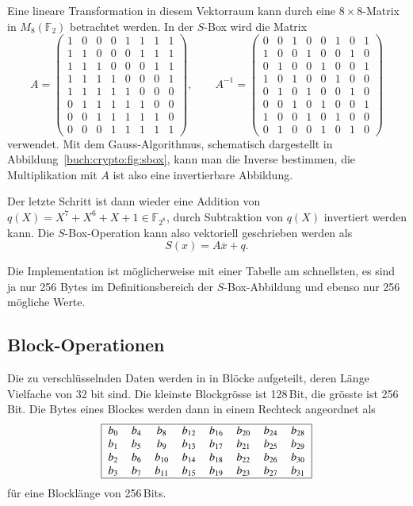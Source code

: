 Eine lineare Transformation in diesem Vektorraum kann durch eine
$8\times 8$-Matrix in $M_8(\mathbb{F}_2)$ betrachtet werden.
In der $S$-Box wird die Matrix
\[
A=
\begin{pmatrix}
1&0&0&0&1&1&1&1\\
1&1&0&0&0&1&1&1\\
1&1&1&0&0&0&1&1\\
1&1&1&1&0&0&0&1\\
1&1&1&1&1&0&0&0\\
0&1&1&1&1&1&0&0\\
0&0&1&1&1&1&1&0\\
0&0&0&1&1&1&1&1
\end{pmatrix},
\qquad
A^{-1}
=
\begin{pmatrix}
0&0&1&0&0&1&0&1\\
1&0&0&1&0&0&1&0\\
0&1&0&0&1&0&0&1\\
1&0&1&0&0&1&0&0\\
0&1&0&1&0&0&1&0\\
0&0&1&0&1&0&0&1\\
1&0&0&1&0&1&0&0\\
0&1&0&0&1&0&1&0
\end{pmatrix}
\]
verwendet.
Mit dem Gauss-Algorithmus, schematisch dargestellt in
Abbildung~\ref{buch:crypto:fig:sbox}, kann man die Inverse
bestimmen, die Multiplikation mit $A$ ist also eine invertierbare
Abbildung.

Der letzte Schritt ist dann wieder eine Addition von
$q(X)=X^7+X^6+X+1\in \mathbb{F}_{2^8}$, durch Subtraktion
von $q(X)$ invertiert werden kann.
Die $S$-Box-Operation kann also vektoriell geschrieben werden als
\[
	S(x) = A\overline{x}+q.
\]

Die Implementation ist möglicherweise mit einer Tabelle am schnellsten,
es sind ja nur 256 Bytes im Definitionsbereich der $S$-Box-Abbildung
und ebenso nur 256 mögliche Werte.

\subsection{Block-Operationen
\label{buch:subsection:block-operationen}}
Die zu verschlüsselnden Daten werden in in Blöcke aufgeteilt, deren
Länge Vielfache von $32$ bit sind.
Die kleinste Blockgrösse ist 128\,Bit, die grösste ist 256\,Bit.
Die Bytes eines Blockes werden dann in einem Rechteck angeordnet
als
\begin{equation}
\begin{tabular}{|>{$}c<{$}>{$}c<{$}>{$}c<{$}>{$}c<{$}>{$}c<{$}>{$}c<{$}>{$}c<{$}>{$}c<{$}|}
\hline
 b_{0} & b_{4} & b_{8}  & b_{12} & b_{16} & b_{20} & b_{24} & b_{28} \\
 b_{1} & b_{5} & b_{9}  & b_{13} & b_{17} & b_{21} & b_{25} & b_{29} \\
 b_{2} & b_{6} & b_{10} & b_{14} & b_{18} & b_{22} & b_{26} & b_{30} \\
 b_{3} & b_{7} & b_{11} & b_{15} & b_{19} & b_{23} & b_{27} & b_{31} \\
\hline
\end{tabular}
\label{buch:crypto:eqn:block}
\end{equation}
für eine Blocklänge von 256\,Bits.



